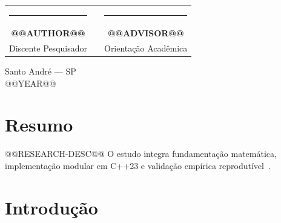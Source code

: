 \documentclass[12pt,a4paper]{article}
\begin{document}
\vfill

\begin{center}
\small
\begin{tabular}{cp{1.5cm}c}
\rule{6.5cm}{0.4pt} & & \rule{6.5cm}{0.4pt}\\
\textbf{@@AUTHOR@@} & & \textbf{@@ADVISOR@@}\\
Discente Pesquisador & & Orientação Acadêmica
\end{tabular}
\end{center}

\vspace{0.8cm}

\begin{center}
\footnotesize
Santo André --- SP\\
@@YEAR@@
\end{center}

\newpage

\pagestyle{empty}
\renewcommand{\contentsname}{Sumário}
\setcounter{tocdepth}{1}
\tableofcontents

\clearpage

\pagestyle{textual}

\section{Resumo}\label{sec:resumo}

@@RESEARCH-DESC@@ O estudo integra fundamentação matemática, implementação modular em C++23 e validação empírica reprodutível~\cite{cormen2022introduction, korte2018combinatorial}.

\vspace{0.35cm}

\section{Introdução}\label{sec:introducao}
\end{document}
